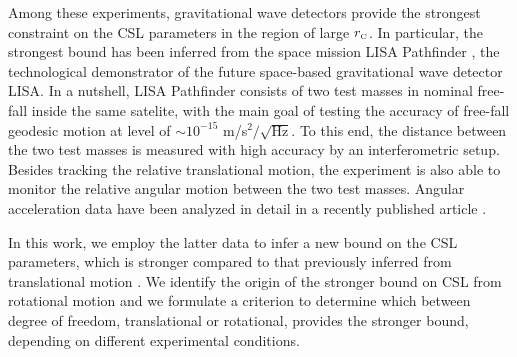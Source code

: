 \documentclass[aps,twocolumn,pra,superscriptaddress]{revtex4-2}
\newcommand\rC{r_\text{\tiny C}}
\begin{document}
{Among these experiments, gravitational wave detectors provide the strongest constraint on the CSL parameters in the region of large $\rC$.
In particular, the strongest bound has been inferred from the space mission LISA Pathfinder \cite{carlesso2016experimental,carlesso2018non}, the technological demonstrator of the future space-based gravitational wave detector LISA.
In a nutshell, LISA Pathfinder consists of two test masses in nominal free-fall inside the same satelite, with the main goal of testing the accuracy of free-fall geodesic motion at level of $\sim 10^{-15}$ m/s$^2/\sqrt{\mathrm{Hz}}$. To this end, the distance between the two test masses is measured with high accuracy by an interferometric setup. Besides tracking the relative translational motion, the experiment is also able to monitor the relative angular motion between the two test masses. Angular acceleration data have been analyzed in detail in a recently published article \cite{armano2024nano}. 

In this work, we employ the latter data to infer a new bound on the CSL parameters, which is stronger compared to that previously inferred from translational motion \cite{carlesso2016experimental}.
We identify the origin of the stronger bound on CSL from rotational motion and we formulate a criterion to determine which  between  degree of freedom, translational or rotational, provides the stronger bound, depending on different experimental conditions.}
\end{document}
